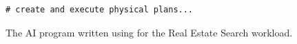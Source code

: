 \begin{figure}
\begin{verbatim}
# create and execute physical plans...
    \end{verbatim}
  \caption{The AI program written using \system{} for the Real Estate Search workload. 
  }
  \label{fig:real-estate-program}
\end{figure}



  




